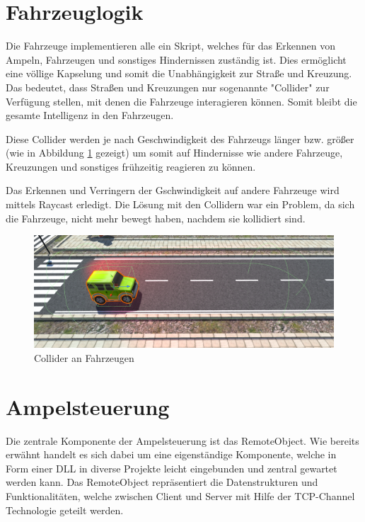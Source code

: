 \section{Fahrzeuglogik}
\label{Fahrzeuglogik}

Die Fahrzeuge implementieren alle ein Skript, welches für das Erkennen von Ampeln, Fahrzeugen und sonstiges Hindernissen zuständig ist. Dies ermöglicht eine völlige Kapselung und somit die Unabhängigkeit zur Straße und Kreuzung. Das bedeutet, dass Straßen und Kreuzungen nur sogenannte "Collider" zur Verfügung stellen, mit denen die Fahrzeuge interagieren können. Somit bleibt die gesamte Intelligenz in den Fahrzeugen.

Diese Collider werden je nach Geschwindigkeit des Fahrzeugs länger bzw. größer (wie in Abbildung \ref{img:car_collider} gezeigt) um somit auf Hindernisse wie andere Fahrzeuge, Kreuzungen und sonstiges frühzeitig reagieren zu können.

Das Erkennen und Verringern der Gschwindigkeit auf andere Fahrzeuge wird mittels Raycast erledigt. Die Lösung mit den Collidern war ein Problem, da sich die Fahrzeuge, nicht mehr bewegt haben, nachdem sie kollidiert sind.

\begin{figure}[H]
\begin{center}
	\includegraphics[width=1\textwidth]{BilderAllgemein/Jeep_Collider.PNG}
\end{center}
	\caption{Collider an Fahrzeugen}
	\label{img:car_collider}
\end{figure}


\section{Ampelsteuerung}

Die zentrale Komponente der Ampelsteuerung ist das RemoteObject. Wie bereits erwähnt handelt es sich dabei um eine eigenständige Komponente, welche in Form einer DLL in diverse Projekte leicht eingebunden und zentral gewartet werden kann. Das RemoteObject repräsentiert die Datenstrukturen und Funktionalitäten, welche zwischen Client und Server mit Hilfe der TCP-Channel Technologie geteilt werden.


